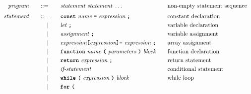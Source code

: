 \begin{alignat*}{9}
&& \textit{program}    &&\quad ::= &\quad && \textit{statement} \ \textit{statement} \ \ldots
                                                           && \textrm{non-empty statement sequence} \\[1mm]
&& \textit{statement}    &&\quad ::= &\quad && \textbf{\texttt{const}}\  \textit{name} \ 
                                           \textbf{\texttt{=}}\  \textit{expression} \ \textbf{\texttt{;}}
                                                           && \textrm{constant declaration} \\
&&                       && |   &\quad && \textit{let} \ \textbf{\texttt{;}}
                                                           && \textrm{variable declaration} \\
&&                       && |   &\quad && \textit{assignment} \ \textbf{\texttt{;}}
                                                           && \textrm{variable assignment} \\
&&                       && |   &\quad && \textit{expression} \textbf{\texttt{[}}
                                          \textit{expression} \textbf{\texttt{]}}
                                           \textbf{\texttt{=}}\  \textit{expression} \ \textbf{\texttt{;}}
                                                           && \textrm{array assignment} \\
&&                       && |   &\quad && \textbf{\texttt{function}}\  \textit{name} \ 
                                   \textbf{\texttt{(}}\  \textit{parameters} \ \textbf{\texttt{)}}\ \textit{block} \quad
                                                           && \textrm{function declaration}\\
&&                       && |   &\quad && \textbf{\texttt{return}}\  \textit{expression} \ \textbf{\texttt{;}}
                                                           && \textrm{return statement}\\
&&                       && |   &\quad && \textit{if-statement} \quad
                                                           && \textrm{conditional statement}\\
&&                       && |   &\quad && \textbf{\texttt{while}}\  
                                   \textbf{\texttt{(}}\  \textit{expression} \ \textbf{\texttt{)}} \
                                   \textit{block}
                                                           && \textrm{while loop}\\
&&                       && |   &\quad && \textbf{\texttt{for}}\ \textbf{\texttt{(}} \ 

\end{alignat*}
